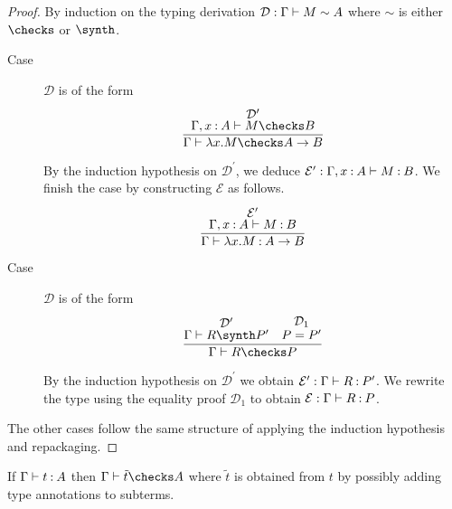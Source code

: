 \documentclass[11pt,letterpaper]{article}
\begin{document}
\begin{proof}
  By induction on the typing derivation
  $\mathcal{D} : \Gamma \vdash M \sim A$ where $\sim$ is either
  $\checks$ or $\synth$.

  \begin{description}
    \item[Case]
      $\mathcal{D}$ is of the form
      \begin{equation*}
        \infer{
          \Gamma \proves \lambda x. M \checks A \to B
        }{
          \deduce[\mathcal{D}^\prime]{
            \Gamma, x\hastype A \proves M \checks B
          }{}
        }
      \end{equation*}

      By the induction hypothesis on $\mathcal{D}^\prime$,
      we deduce
      $\mathcal{E}^\prime : \Gamma, x\mathbin{:} A \vdash M \mathbin{:} B$.
      We finish the case by constructing $\mathcal{E}$ as follows.
      \begin{equation*}
        \infer{
          \Gamma \proves \lambda x. M \hastype A \to B
        }{
          \deduce[\mathcal{E}^\prime]{
            \Gamma, x\hastype A \proves M \hastype B
          }{}
        }
      \end{equation*}

    \item[Case]
      $\mathcal{D}$ is of the form
      \begin{equation*}
        \infer{
          \Gamma \proves R \checks P
        }{
          \deduce[\mathcal{D}^\prime]{\Gamma \proves R \synth P^\prime}{}
          &
          \deduce[\mathcal{D}_1]{P = P^\prime}{}
        }
      \end{equation*}

      By the induction hypothesis on $\mathcal{D}^\prime$ we obtain
      $\mathcal{E}^\prime : \Gamma \vdash R \mathbin{:} P^\prime$.
      We rewrite the type using the equality proof $\mathcal{D}_1$ to obtain
      $\mathcal{E} : \Gamma \vdash R \mathbin{:} P$.
  \end{description}

  The other cases follow the same structure of applying the induction
  hypothesis and repackaging.
\end{proof}

\begin{prop}[Completeness]
  If $\Gamma \vdash t \mathbin{:} A$ then $\Gamma \proves \tilde t \checks A$
  where $\tilde t$ is obtained from $t$ by possibly adding type annotations to
  subterms.
\end{prop}
\end{document}
